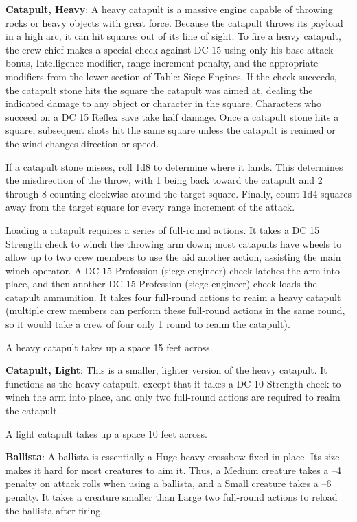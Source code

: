 \textbf{Catapult, Heavy}: A heavy catapult is a massive engine capable of throwing rocks or heavy objects with great force. Because the catapult throws its payload in a high arc, it can hit squares out of its line of sight. To fire a heavy catapult, the crew chief makes a special check against DC 15 using only his base attack bonus, Intelligence modifier, range increment penalty, and the appropriate modifiers from the lower section of Table: Siege Engines. If the check succeeds, the catapult stone hits the square the catapult was aimed at, dealing the indicated damage to any object or character in the square. Characters who succeed on a DC 15 Reflex save take half damage. Once a catapult stone hits a square, subsequent shots hit the same square unless the catapult is reaimed or the wind changes direction or speed.
				
If a catapult stone misses, roll 1d8 to determine where it lands. This determines the misdirection of the throw, with 1 being back toward the catapult and 2 through 8 counting clockwise around the target square. Finally, count 1d4 squares away from the target square for every range increment of the attack.
				
Loading a catapult requires a series of full-round actions. It takes a DC 15 Strength check to winch the throwing arm down; most catapults have wheels to allow up to two crew members to use the aid another action, assisting the main winch operator. A DC 15 Profession (siege engineer) check latches the arm into place, and then another DC 15 Profession (siege engineer) check loads the catapult ammunition. It takes four full-round actions to reaim a heavy catapult (multiple crew members can perform these full-round actions in the same round, so it would take a crew of four only 1 round to reaim the catapult).
				
A heavy catapult takes up a space 15 feet across.
				
\textbf{Catapult, Light}: This is a smaller, lighter version of the heavy catapult. It functions as the heavy catapult, except that it takes a DC 10 Strength check to winch the arm into place, and only two full-round actions are required to reaim the catapult.
				
A light catapult takes up a space 10 feet across.
								
\textbf{Ballista}: A ballista is essentially a Huge heavy crossbow fixed in place. Its size makes it hard for most creatures to aim it\textit{. }Thus, a Medium creature takes a --4 penalty on attack rolls when using a ballista, and a Small creature takes a --6 penalty. It takes a creature smaller than Large two full-round actions to reload the ballista after firing.
				
